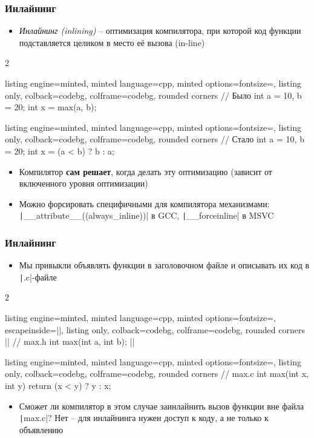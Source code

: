 \documentclass[10pt]{beamer}
\begin{document}
\begin{frame}[fragile]
\frametitle{Инлайнинг}
\begin{itemize}
\item \textit{Инлайнинг (inlining)} -- оптимизация компилятора, при которой код функции подставляется целиком в место её вызова (in-line)
\end{itemize}
\pause
{}
\begin{multicols}{2}
\begin{tcblisting}{listing engine=minted, minted language=cpp, minted options={fontsize=\scriptsize}, listing only, colback=codebg, colframe=codebg, rounded corners}
// Было
int a = 10, b = 20;
int x = max(a, b);
\end{tcblisting}
\columnbreak
\begin{tcblisting}{listing engine=minted, minted language=cpp, minted options={fontsize=\scriptsize}, listing only, colback=codebg, colframe=codebg, rounded corners}
// Стало
int a = 10, b = 20;
int x = (a < b) ? b : a;
\end{tcblisting}
\end{multicols}
\pause
\begin{itemize}
\item Компилятор \textbf{сам решает}, когда делать эту оптимизацию (зависит от включенного уровня оптимизации)
\pause
\item Можно форсировать специфичными для компилятора механизмами: \texttt|__attribute__((always_inline))| в GCC, \texttt|__forceinline| в MSVC
\end{itemize}
\end{frame}

\begin{frame}[fragile]
\frametitle{Инлайнинг}
\begin{itemize}
\item Мы привыкли объявлять функции в заголовочном файле и описывать их код в \texttt|.c|-файле
\end{itemize}
\begin{multicols}{2}
\begin{tcblisting}{listing engine=minted, minted language=cpp, minted options={fontsize=\scriptsize, escapeinside=||}, listing only, colback=codebg, colframe=codebg, rounded corners}
|{\phantom{Xg}}|
// max.h
int max(int a, int b);
|{\phantom{Xg}}|
\end{tcblisting}
\columnbreak
\begin{tcblisting}{listing engine=minted, minted language=cpp, minted options={fontsize=\scriptsize}, listing only, colback=codebg, colframe=codebg, rounded corners}
// max.c
int max(int x, int y) {
  return (x < y) ? y : x;
}
\end{tcblisting}
\end{multicols}
\pause
\begin{itemize}
\item Сможет ли компилятор в этом случае заинлайнить вызов функции вне файла \texttt|max.c|? \pause Нет -- для инлайнинга нужен доступ к коду, а не только к объявлению
\end{itemize}
\end{frame}
\end{document}
